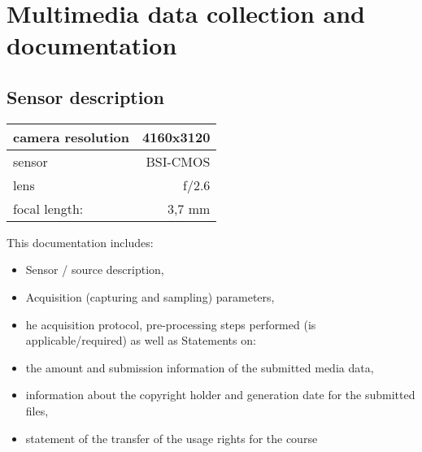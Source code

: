 \section{Multimedia data collection and documentation}

\subsection{Sensor description}

\begin{tabular}{ l | r }
	\hline
    camera resolution & 4160x3120 \\ \hline
    sensor & BSI-CMOS \\ \hline
    lens & f/2.6 \\ \hline
    focal length: & 3,7 mm \\ 
    \hline
\end{tabular}





This documentation includes: 
\begin{itemize}
	\item Sensor / source description, 
	\item Acquisition (capturing and sampling) parameters,
	\item he acquisition protocol, pre-processing steps performed (is applicable/required) as well as
	Statements on:
	\item the amount and submission information of the submitted media data,
	\item information about the copyright holder and generation date for the submitted files,
	\item statement of the transfer of the usage rights for the course


\end{itemize}